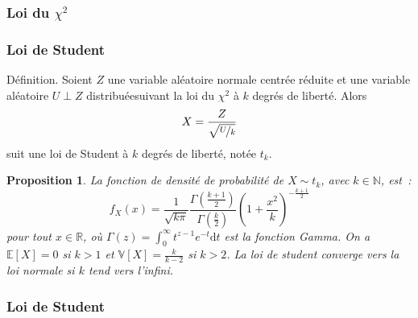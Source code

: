 \documentclass[10pt]{beamer}
\theoremstyle{plain}
\newenvironment{defn}[1]
{\bgroup \small\begin{block}{Définition. #1}}
  {\end{block}\egroup}
\newtheorem{prop}{Proposition}
\begin{document}
\begin{frame}
  \frametitle{Loi du $\chi^2$}

  \bigskip

  \begin{center}
    
  \end{center}


\end{frame}


\begin{frame}
  \frametitle{Loi de Student}

  \begin{defn}{}
    Soient $Z$ une variable aléatoire normale centrée réduite et une variable aléatoire $U\perp Z$ distribuéesuivant la loi du $\chi^2$ à $k$ degrés de liberté. Alors
    \[
      X = \frac{Z}{\sqrt{\nicefrac{U}{k}}}
    \]
    suit une loi de Student à $k$ degrés de liberté, notée $t_k$.
  \end{defn}

  \bigskip

  \begin{prop}\label{prop:student}
    La fonction de densité de probabilité de $X\sim t_k$,
    avec $k\in\mathbb N$, est~:
    \[
      f_X(x) =
      \frac{1}{\sqrt{k\pi}}\frac{\Gamma(\frac{k+1}{2})}{\Gamma(\frac{k}{2})}\left(1+\frac{x^2}{k}\right)^{-\frac{k+1}{2}}
    \]
    pour tout $x\in\mathbb R$, où $\Gamma(z) = \int_0^{\infty}t^{z-1}e^{-t}\mathrm dt$ est la
    fonction Gamma. On a $\mathbb E\left[ X \right]=0$ si $k>1$ et $\mathbb V\left[ X \right] = \frac{k}{k-2}$ si $k>2$. La loi de student converge vers la loi normale si $k$ tend vers l'infini.
  \end{prop}

\end{frame}


\begin{frame}
  \frametitle{Loi de Student}

  \bigskip

  \begin{center}
    
  \end{center}


\end{frame}
\end{document}
